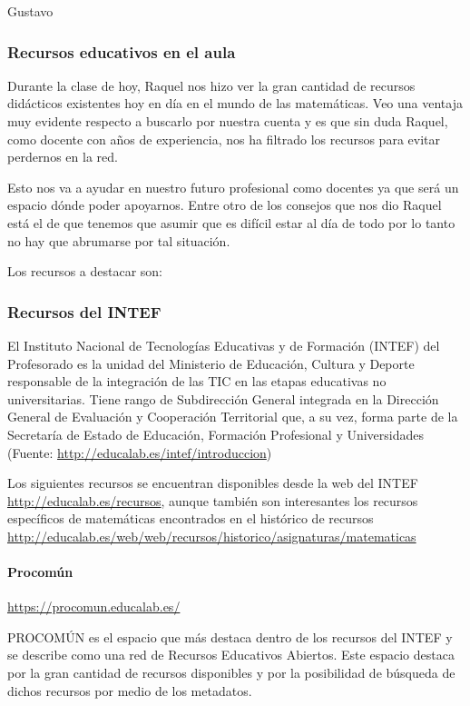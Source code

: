 \begin{opin}{\guscolor}{Gustavo}

\subsubsection{Recursos educativos en el aula}
Durante la clase de hoy, Raquel nos hizo ver la gran cantidad de recursos didácticos existentes hoy en día en el mundo de las matemáticas. Veo una ventaja muy evidente respecto a buscarlo por nuestra cuenta y es que sin duda Raquel, como docente con años de experiencia, nos ha filtrado los recursos para evitar perdernos en la red.

Esto nos va a ayudar en nuestro futuro profesional como docentes ya que será un espacio dónde poder apoyarnos. Entre otro de los consejos que nos dio Raquel está el de que tenemos que asumir que es difícil estar al día de todo por lo tanto no hay que abrumarse por tal situación.

Los recursos a destacar son:

\subsubsection{Recursos del INTEF}
El Instituto Nacional de Tecnologías Educativas y de Formación  (INTEF) del Profesorado es la unidad del Ministerio de Educación, Cultura y Deporte responsable de la integración de las TIC en las etapas educativas no universitarias. Tiene rango de Subdirección General integrada en la Dirección General de Evaluación y Cooperación Territorial que, a su vez, forma parte de la Secretaría de Estado de Educación, Formación Profesional y Universidades (Fuente: \url{http://educalab.es/intef/introduccion})

Los siguientes recursos se encuentran disponibles desde la web del INTEF \url{http://educalab.es/recursos}, aunque también son interesantes los recursos específicos de matemáticas encontrados en el histórico de recursos \url{http://educalab.es/web/web/recursos/historico/asignaturas/matematicas}

\paragraph{Procomún}
\url{https://procomun.educalab.es/}

PROCOMÚN es el espacio que más destaca dentro de los recursos del INTEF y se describe como una red de Recursos Educativos Abiertos. Este espacio destaca por la gran cantidad de recursos disponibles y por la posibilidad de búsqueda de dichos recursos por medio de los metadatos.


\end{opin}
